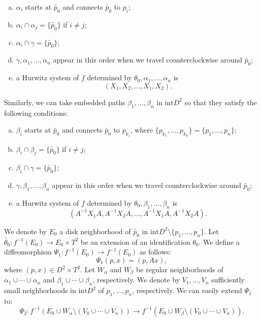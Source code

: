 \documentclass{amsart}
\theoremstyle{plain}
\theoremstyle{definition}
\begin{document}
\begin{enumerate}[(a)]

\setlength{\itemindent}{10pt}

\item $\alpha_i$ starts at $\tilde{p_0}$ and connects $\tilde{p_0}$ to $p_i$; 

\item $\alpha_i\cap\alpha_j=\{\tilde{p_0}\}$ if $i\neq j$; 

\item $\alpha_i\cap\gamma=\{\tilde{p_0}\}$; 

\item $\gamma,\alpha_1,\ldots,\alpha_n$ appear in this order when we travel counterclockwise around $\tilde{p_0}$; 

\item a Hurwitz system of $f$ determined by $\theta_0,\alpha_1,\ldots,\alpha_n$ is 
\[
(X_1,X_2,\ldots,X_1,X_2). 
\]

\end{enumerate}

Similarly, we can take embedded paths $\beta_1,\ldots,\beta_n$ in $\text{int}D^2$ so that they satisfy the following conditions: 

\begin{enumerate}[(a)$^\prime$]

\setlength{\itemindent}{10pt}

\item $\beta_i$ starts at $\tilde{p_0}$ and connects $\tilde{p_0}$ to $p_{k_i}$, where $\{p_{k_1},\ldots,p_{k_n}\}=\{p_1,\ldots,p_n\}$; 

\item $\beta_i\cap\beta_j=\{\tilde{p_0}\}$ if $i\neq j$; 

\item $\beta_i\cap\gamma=\{\tilde{p_0}\}$; 

\item $\gamma,\beta_1,\ldots,\beta_n$ appear in this order when we travel counterclockwise around $\tilde{p_0}$; 

\item a Hurwitz system of $f$ determined by $\theta_0,\beta_1,\ldots,\beta_n$ is 
\[
(A^{-1}X_1A,A^{-1}X_2A,\ldots,A^{-1}X_1A,A^{-1}X_2A). 
\]

\end{enumerate}

We denote by $E_0$ a disk neighborhood of $\tilde{p_0}$ in $\text{int}D^2\setminus\{p_1,\ldots,p_n\}$. 
Let $\tilde{\theta_0}:f^{-1}(E_0)\rightarrow E_0\times T^2$ be an extension of an identification $\theta_0$. 
We define a diffeomorphism $\Psi_1:f^{-1}(E_0)\rightarrow f^{-1}(E_0)$ as follows: 
\[
\Psi_1(p,x)=(p,Ax), 
\]
where $(p,x)\in D^2\times T^2$. 
Let $W_\alpha$ and $W_\beta$ be regular neighborhoods of $\alpha_1\cup\cdots\cup\alpha_n$ and $\beta_1\cup\cdots\cup\beta_n$, respectively. 
We denote by $V_1,\ldots,V_n$ sufficiently small neighborhoods in $\text{int}D^2$ of $p_1,\ldots,p_n$, respectively. 
We can easily extend $\Psi_1$ to: 
\[
\Psi_2:f^{-1}(E_0\cup W_\alpha\setminus(V_0\cup\cdots\cup V_n))\rightarrow f^{-1}(E_0\cup W_\beta\setminus(V_0\cup\cdots\cup V_n)). 
\]
\end{document}

